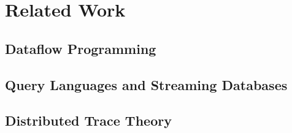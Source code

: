 \section{Related Work}
\label{sec:rw}

\subsection{Dataflow Programming}

\subsection{Query Languages and Streaming Databases}

\subsection{Distributed Trace Theory}

